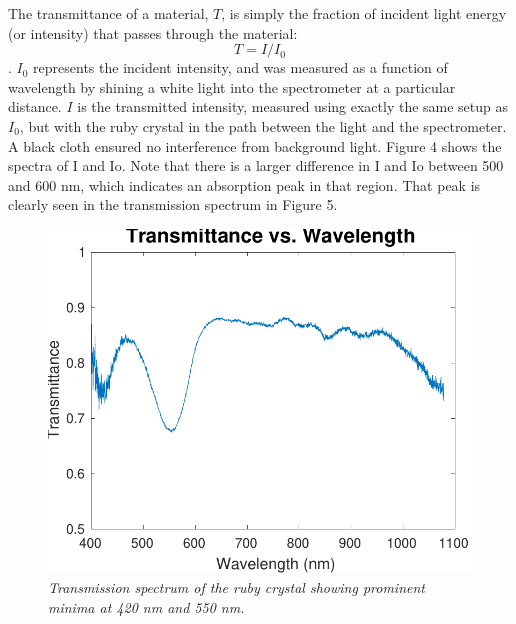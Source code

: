 \documentclass[11pt, a4paper, twocolumn]{article}
\begin{document}
The transmittance of a material, $T$, is simply the fraction of incident light energy (or intensity) that passes through the material:
\setlength{\abovedisplayskip}{8pt}
\setlength{\belowdisplayskip}{8pt}
$$T=I/I_0$$.
$I_0$ represents the incident intensity, and was measured as a function of wavelength by shining a white light into the spectrometer at a particular distance. $I$ is the transmitted intensity, measured using exactly the same setup as $I_0$, but with the ruby crystal in the path between the light and the spectrometer. A black cloth ensured no interference from background light. Figure 4 shows the spectra of I and Io. Note that there is a larger difference in I and Io between 500 and 600 nm, which indicates an absorption peak in that region. That peak is clearly seen in the transmission spectrum in Figure 5.

\begin{figure}[H]
\includegraphics[width=\linewidth]{transmissionSpectrum.pdf}
\caption{\textit{Transmission spectrum of the ruby crystal showing prominent minima at 420 nm and 550 nm.}}
\label{fig:intensities}
\end{figure}
\end{document}
